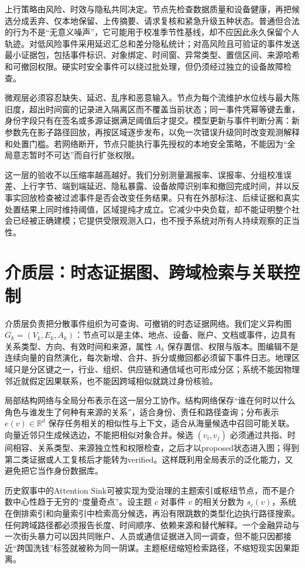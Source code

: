 上行策略由风险、时效与隐私共同决定。节点先检查数据质量和设备健康，再把候选分成丢弃、仅本地保留、上传摘要、请求复核和紧急升级五种状态。普通但合法的行为不是“无意义噪声”，它可能用于校准季节性基线，却不应因此永久保留个人轨迹。对低风险事件采用延迟汇总和差分隐私统计；对高风险且可验证的事件发送最小证据包，包括事件标识、对象绑定、时间窗、异常类型、置信区间、来源哈希和可撤回权限。硬实时安全事件可以绕过批处理，但仍须经过独立的设备故障检查。

微观层必须容忍缺失、延迟、乱序和恶意输入。节点为每个流维护水位线与最大陈旧度，超出时间窗的记录进入隔离区而不覆盖当前状态；同一事件凭幂等键去重，身份字段只有在签名或多源证据满足阈值后才提交。模型更新与事件判断分离：新参数先在影子路径回放，再按区域逐步发布，以免一次错误升级同时改变观测解释和处置门槛。若网络断开，节点只能执行事先授权的本地安全策略，不能因为“全局意志暂时不可达”而自行扩张权限。

这一层的验收不以压缩率越高越好。我们分别测量漏报率、误报率、分组校准误差、上行字节、端到端延迟、隐私暴露、设备故障识别率和撤回完成时间，并以反事实回放检查被过滤事件是否会改变任务结果。只有在外部标注、后续证据和真实处置结果上同时维持阈值，区域提纯才成立。它减少中央负载，却不能证明整个社会已经被正确建模；它提供受限观测入口，也不授予系统对所有人持续观察的正当性。

\section{介质层：时态证据图、跨域检索与关联控制}
\label{sec:gaia_medium_layer}

介质层负责把分散事件组织为可查询、可撤销的时态证据网络。我们定义异构图 $G_k=(V_k,E_k,A_k)$：节点可以是主体、地点、设备、账户、文档或事件，边具有关系类型、方向、有效时间和来源，属性 $A_k$ 保存置信、权限与版本。图编辑不是连续向量的自然演化，每次新增、合并、拆分或撤回都必须留下事件日志。地理区域只是分区键之一，行业、组织、供应链和通信域也可形成分区；系统不能因物理邻近就假定因果联系，也不能因跨域相似就跳过身份核验。

局部结构网络与全局分布表示在这一层分工协作。结构网络保存“谁在何时以什么角色与谁发生了何种有来源的关系”，适合身份、责任和路径查询；分布表示 $e(v)\in\mathbb R^d$ 保存任务相关的相似性与上下文，适合从海量候选中召回可能关联。向量近邻只生成候选边，不能把相似对象合并。候选 $(v_i,v_j)$ 必须通过共指、时间相容、关系类型、来源独立性和权限检查，之后才以proposed状态进入图；得到第二类证据或人工复核后才能转为verified。这样既利用全局表示的泛化能力，又避免把它当作身份数据库。

历史叙事中的Attention Sink可被实现为受治理的主题索引或枢纽节点，而不是介数中心性趋于无穷的“度量奇点”。设主题 $c$ 对事件 $v$ 的相关分数为 $s_c(v)$，系统在倒排索引和向量索引中检索高分候选，再沿有限跳数的类型化边执行路径搜索。任何跨域路径都必须报告长度、时间顺序、依赖来源和替代解释。一个金融异动与一次街头暴力可以因共同账户、人员或通信证据进入同一调查，但不能只因都接近“跨国洗钱”标签就被称为同一阴谋。主题枢纽缩短检索路径，不缩短现实因果距离。

